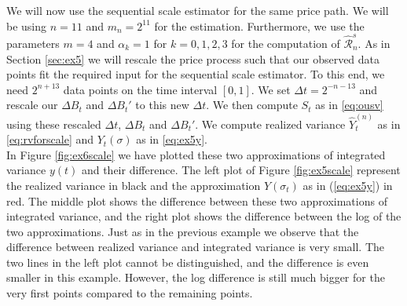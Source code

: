 \documentclass{article}
\begin{document}
We will now use the sequential scale estimator for the same price path. We will be using $n=11$ and $m_n=2^{11}$ for the estimation. Furthermore, we use the parameters $m=4$ and $\alpha_k=1$ for $k=0,1,2,3$ for the computation of $\widehat{\mathscr{R}}_n^s$. As in Section \ref{sec:ex5} we will rescale the price process such that our observed data points fit the required input for the sequential scale estimator. To this end, we need $2^{n+13}$ data points on the time interval $[0,1]$. We set $\Delta t=2^{-n-13}$ and rescale our $\Delta B_t$ and $\Delta B_t'$ to this new $\Delta t$. We then compute $S_t$ as in \eqref{eq:ousv} using these rescaled $\Delta t$, $\Delta B_t$ and $\Delta B_t'$. We compute realized variance $\hat{Y}_t^{(n)}$ as in \eqref{eq:rvforscale} and $Y_t(\sigma)$ as in \eqref{eq:ex5y}. \\
In Figure \ref{fig:ex6scale} we have plotted these two approximations of integrated variance $y(t)$ and their difference. The left plot of Figure \ref{fig:ex5scale} represent the realized variance in black and the approximation $Y(\sigma_t)$ as in (\ref{eq:ex5y}) in red. The middle plot shows the difference between these two approximations of integrated variance, and the right plot shows the difference between the log of the two approximations. Just as in the previous example we observe that the difference between realized variance and integrated variance is very small. The two lines in the left plot cannot be distinguished, and the difference is even smaller in this example. However, the log difference is still much bigger for the very first points compared to the remaining points.
\end{document}
